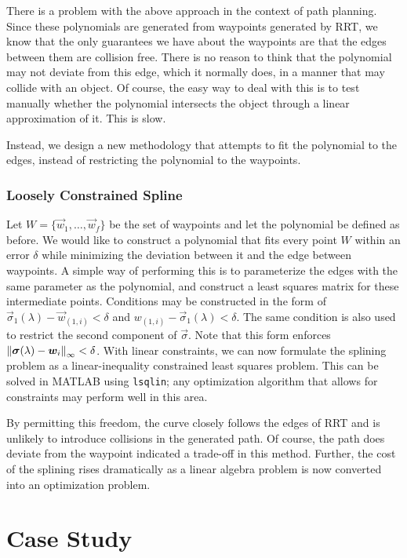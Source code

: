 \documentclass[oneside, 11pt]{book}
\begin{document}
There is a problem with the above approach in the context of path planning. Since these polynomials are generated from waypoints generated by RRT, we know that the only guarantees we have about the waypoints are that the edges between them are collision free. There is no reason to think that the polynomial may not deviate from this edge, which it normally does, in a manner that may collide with an object. Of course, the easy way to deal with this is to test manually whether the polynomial intersects the object through a linear approximation of it. This is slow.

Instead, we design a new methodology that attempts to fit the polynomial to the edges, instead of restricting the polynomial to the waypoints.

\subsection{Loosely Constrained Spline}\label{sec:restrictpolyfit}
Let $W=\{\vec{w}_1, \dots, \vec{w}_f\}$ be the set of waypoints and let the polynomial be defined as before. We would like to construct a polynomial that fits every point $W$ within an error $\delta$ while minimizing the deviation between it and the edge between waypoints. A simple way of performing this is to parameterize the edges with the same parameter as the polynomial, and construct a least squares matrix for these intermediate points. Conditions may be constructed in the form of $\vec{\sigma}_1(\lambda) - \vec{w}_{(1,i)} < \delta$ and $w_{(1,i)} - \vec{\sigma}_1(\lambda) < \delta$. The same condition is also used to restrict the second component of $\vec{\sigma}$. Note that this form enforces $\mathop{}\!\left\| \bm{\sigma}(\lambda) - \bm{w}_i \right\|_\infty < \delta$. With linear constraints, we can now formulate the splining problem as a linear-inequality constrained least squares problem. This can be solved in MATLAB using \texttt{lsqlin}; any optimization algorithm that allows for constraints may perform well in this area.

By permitting this freedom, the curve closely follows the edges of RRT and is unlikely to introduce collisions in the generated path. Of course, the path does deviate from the waypoint indicated a trade-off in this method. Further, the cost of the splining rises dramatically as a linear algebra problem is now converted into an optimization problem.

\chapter{Case Study}
\end{document}
